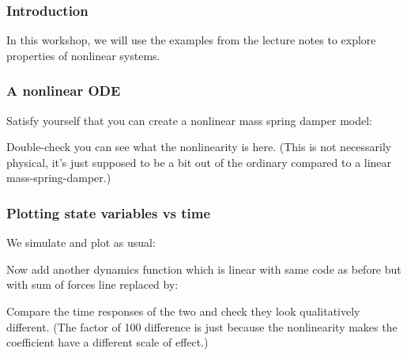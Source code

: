 \documentclass[9pt]{beamer-control}
\begin{document}

\begin{frame}
\frametitle{Introduction}
In this workshop, we will use the examples from the lecture notes to explore properties of nonlinear systems.
\end{frame}


\begin{frame}
\frametitle{A nonlinear ODE}

Satisfy yourself that you can create a nonlinear mass spring damper model:


Double-check you can see what the nonlinearity is here. (This is not necessarily physical, it's just supposed to be a bit out of the ordinary compared to a linear mass-spring-damper.)

\end{frame}

\begin{frame}
\frametitle{Plotting state variables vs time}
We simulate and plot as usual:


Now add another dynamics function which is linear with same code as before but with sum of forces line replaced by:


Compare the time responses of the two and check they look qualitatively different. (The factor of 100 difference is just because the nonlinearity makes the coefficient have a different scale of effect.)

\end{frame}
\end{document}
